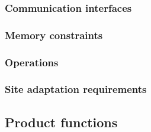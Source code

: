 \documentclass{scrreprt}
\begin{document}
\subsubsection{Communication interfaces}


\subsubsection{Memory constraints}


\subsubsection{Operations}


\subsubsection{Site adaptation requirements}


\subsection{Product functions}

\end{document}
